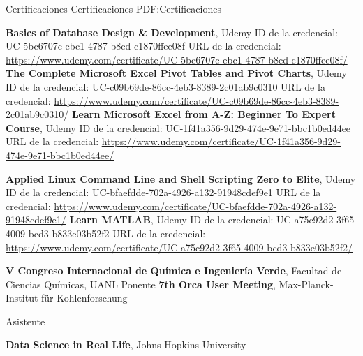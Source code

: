 \Section
{Certificaciones}
{Certificaciones}
{PDF:Certificaciones}

\Entry
    {\textbf{Basics of Database Design \& Development}}, 
    \newline
    Udemy
    \Gap
    \BulletItem
    ID de la credencial: UC-5bc6707c-ebc1-4787-b8cd-c1870ffee08f
    URL de la credencial: \url{https://www.udemy.com/certificate/UC-5bc6707c-ebc1-4787-b8cd-c1870ffee08f/}
    \hfill
    \Entry
\Gap
    \Entry
    {\textbf{The Complete Microsoft Excel Pivot Tables and Pivot Charts}}, 
    \newline
    Udemy
    \Gap
    \BulletItem
    ID de la credencial: UC-c09b69de-86cc-4eb3-8389-2c01ab9c0310
    URL de la credencial: \url{https://www.udemy.com/certificate/UC-c09b69de-86cc-4eb3-8389-2c01ab9c0310/}
    \hfill
    \Gap
    \Entry
    {\textbf{Learn Microsoft Excel from A-Z: Beginner To Expert Course}}, 
    \newline
    Udemy
    \Gap
    \BulletItem
    ID de la credencial: UC-1f41a356-9d29-474e-9e71-bbc1b0ed44ee
    URL de la credencial: \url{https://www.udemy.com/certificate/UC-1f41a356-9d29-474e-9e71-bbc1b0ed44ee/}
    \hfill

    \Gap

\Entry
    {\textbf{Applied Linux Command Line and Shell Scripting Zero to Elite}}, 
    \newline
    Udemy
    \Gap
    \BulletItem
    ID de la credencial: UC-bfaefdde-702a-4926-a132-91948cdef9e1
    URL de la credencial: \url{https://www.udemy.com/certificate/UC-bfaefdde-702a-4926-a132-91948cdef9e1/}
    \hfill
    \Gap
    \Entry
    {\textbf{Learn MATLAB}}, 
    \newline
    Udemy
    \Gap
    \BulletItem
    ID de la credencial: UC-a75c92d2-3f65-4009-bcd3-b833e03b52f2
    URL de la credencial: \url{https://www.udemy.com/certificate/UC-a75c92d2-3f65-4009-bcd3-b833e03b52f2/}
    \hfill
    \Gap

\Entry
    {\textbf{V Congreso Internacional de Química e Ingeniería Verde}},
    \newline
    Facultad de Ciencias Químicas, UANL
\Gap
    \BulletItem
    Ponente
    \hfill
    \Gap
\Entry
    {\textbf{7th Orca User Meeting}},
    \newline
    Max-Planck-Institut für Kohlenforschung

    \Gap
    \BulletItem
    Asistente
    \hfill

\Entry

{\textbf{Data Science in Real Life}},
\newline
Johns Hopkins University
\hfill
{}
